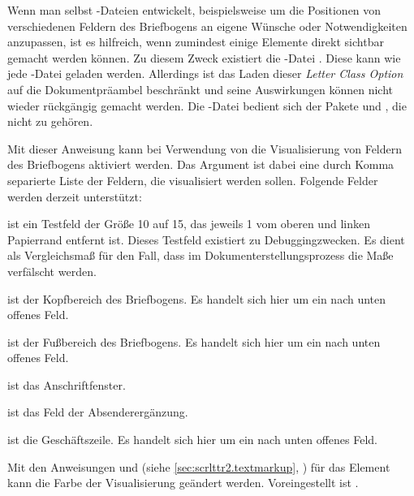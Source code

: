 \begin{Declaration}
\end{Declaration}
%
Wenn man selbst -Dateien entwickelt, beispielsweise um die
Positionen von verschiedenen Feldern des Briefbogens an eigene Wünsche oder
Notwendigkeiten anzupassen, ist es hilfreich, wenn zumindest einige Elemente
direkt sichtbar gemacht werden können. Zu diesem Zweck existiert die
-Datei
. Diese kann wie jede
-Datei geladen werden. Allerdings ist das Laden dieser \emph{Letter
  Class Option} auf die Dokumentpräambel beschränkt und seine Auswirkungen
können nicht wieder rückgängig gemacht werden. Die -Datei bedient
sich der Pakete
%
und , die nicht zu \KOMAScript{}
gehören.

\begin{Declaration}
\end{Declaration}
Mit dieser Anweisung kann bei Verwendung von  die
Visualisierung von Feldern des Briefbogens aktiviert werden. Das Argument
 ist dabei eine durch Komma separierte Liste der Feldern, die
visualisiert werden sollen. Folgende Felder werden derzeit unterstützt:
\begin{labeling}[~--]{}
\item[\PValue{test}] ist ein Testfeld der Größe 10 auf 15,
  das jeweils 1 vom oberen und linken Papierrand entfernt ist. Dieses
  Testfeld existiert zu Debuggingzwecken. Es dient als Vergleichsmaß für den
  Fall, dass im Dokumenterstellungsprozess die Maße verfälscht werden.
\item[\PValue{head}] ist der Kopfbereich des Briefbogens. Es handelt sich hier
  um ein nach unten offenes Feld.
\item[\PValue{foot}] ist der Fußbereich des Briefbogens. Es handelt sich hier
  um ein nach unten offenes Feld.
\item[\PValue{address}] ist das Anschriftfenster.
\item[\PValue{location}] ist das Feld der Absenderergänzung.
\item[\PValue{refline}] ist die Geschäftszeile. Es handelt sich hier um ein
  nach unten offenes Feld.
\end{labeling}%
%
Mit den Anweisungen  und
 (siehe \autoref{sec:scrlttr2.textmarkup},
) für das Element
 kann die Farbe der
Visualisierung geändert werden. Voreingestellt ist .%
%
%
\EndIndexGroup


